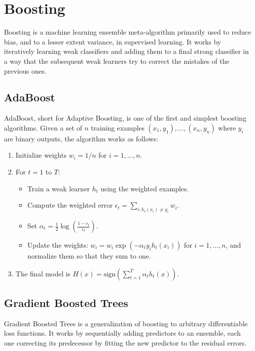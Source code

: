 \chapter{Boosting}


Boosting is a machine learning ensemble meta-algorithm primarily used
to reduce bias, and to a lesser extent variance, in supervised
learning. It works by iteratively learning weak classifiers and adding
them to a final strong classifier in a way that the subsequent weak
learners try to correct the mistakes of the previous ones.

\section{AdaBoost}

AdaBoost, short for Adaptive Boosting, is one of the first and
simplest boosting algorithms. Given a set of $n$ training examples
$(x_1, y_1), \ldots, (x_n, y_n)$ where $y_i$ are binary outputs, the
algorithm works as follows:

\begin{enumerate}
    \item Initialize weights $w_i = 1/n$ for $i = 1, \ldots, n$.
    \item For $t = 1$ to $T$:
    \begin{itemize}
        \item Train a weak learner $h_t$ using the weighted examples.
        \item Compute the weighted error $\epsilon_t = \sum_{i:h_t(x_i) \neq y_i} w_i$.
        \item Set $\alpha_t = \frac{1}{2} \log \left(\frac{1-\epsilon_t}{\epsilon_t}\right)$.
        \item Update the weights: $w_i = w_i \exp(-\alpha_t y_i h_t(x_i))$ for $i = 1, \ldots, n$, and normalize them so that they sum to one.
    \end{itemize}
    \item The final model is $H(x) = \text{sign}\left(\sum_{t=1}^{T} \alpha_t h_t(x)\right)$.
\end{enumerate}

\section{Gradient Boosted Trees}

Gradient Boosted Trees is a generalization of boosting to arbitrary
differentiable loss functions. It works by sequentially adding
predictors to an ensemble, each one correcting its predecessor by
fitting the new predictor to the residual errors.


